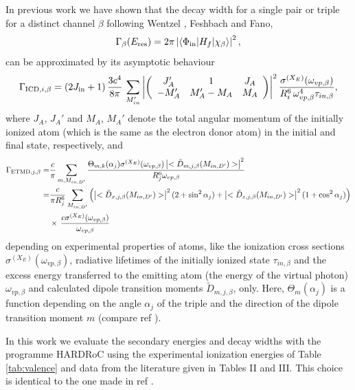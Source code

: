 In previous work \cite{Fasshauer13,Fasshauer_thesis} we have shown that
the decay width for a single pair or triple for a distinct channel $\beta$
following Wentzel \cite{Wentzel27}, Feshbach\cite{Feshbach58,Feshbach62}
and Fano,\cite{Fano61}
%
\begin{equation}
 \Gamma_{\beta}(E_{\rm res}) = 2\pi \left|
                           \braket{\Phi_{\rm in}| H_f |\chi_{\beta}}
                           \right|^2,
\end{equation}
%
can be approximated by its asymptotic behaviour
%
\begin{equation}
 \Gamma_{{\rm ICD},i,\beta} = (2J_{\rm in}+1)\, \frac{3c^4}{8\pi}\,
                        \sum\limits_{M_{in}'}
                        \left| \left(
                        \begin{array}{ccc}
                        J_A'  & 1        & J_A\\
                        -M_A' & M_A'-M_A & M_A
                        \end{array}\right) \right|^2
                        \frac{\sigma^{(X_E)}(\omega_{vp,\beta})}
                        {R_i^6 \, \omega_{vp,\beta}^4 \tau_{in,\beta}},
\end{equation}
%
where $J_A$, $J_A'$ and $M_A$, $M_A'$ denote the total angular momentum of the
initially ionized atom (which is the same as the electron donor atom) in the
initial and final state, respectively,
and
%
\begin{align}
 \Gamma_{{\rm ETMD},j,\beta} =& \frac{c}{\pi} \sum\limits_{m,M_{in,D'}}
                        \frac{\Theta_{m,k}(\alpha_j) \sigma^{(X_E)}(\omega_{vp,\beta})
                              \left| <\tilde{D}_{m,j,\beta}(M_{in,D'})>\right|^2}
                         {R_j^6 \omega_{vp,\beta}}\\
               =& \frac{c}{\pi R_j^6}
               \sum\limits_{M_{in,D'}}
               \left( \left| <\tilde{D}_{x,j,\beta} (M_{in,D'}) > \right|^2
                 (2+ \sin^2\alpha_j)
               + \left| <\tilde{D}_{z,j,\beta} (M_{in,D'}) > \right|^2
                 (1+\cos^2\alpha_j) \right) \nonumber \\
           & \times\, \frac{c\sigma^{(X_E)}(\omega_{vp,\beta})}{\omega_{vp,\beta}}
\end{align}
%
depending on 
experimental properties
of atoms, like the ionization cross sections
$\sigma^{(X_E)}(\omega_{vp,\beta})$, radiative lifetimes of the initially
ionized state $\tau_{in,\beta}$ and the excess energy transferred to the
emitting atom (the energy of the virtual photon) $\omega_{vp,\beta}$
and calculated dipole transition moments $\tilde{D}_{m,j,\beta}$, only.
Here, $\Theta_{m}(\alpha_j)$ is a function depending on the angle $\alpha_j$
of the triple and the direction of the dipole
transition moment $m$
(compare ref ).

In this work we evaluate the secondary energies and decay widths with
the programme HARDRoC\cite{HARDRoC,fasshauer2014} using the
experimental ionization energies of Table \ref{tab:valence}
and data from the literature given in Tables II and III.
This choice is identical to the one made in ref .
